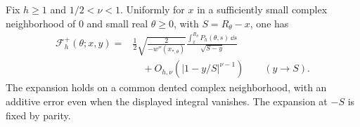 \begin{prp}\label{prp:s08:recovered-singularity}
Fix $h\geq1$ and $1/2<\nu<1$. Uniformly for $x$ in a sufficiently
small complex neighborhood of $0$ and small real $\theta\geq0$,
with $S=R_\theta-x$, one has
\begin{equation}\label{eq:s08:recovered-singularity}
 \begin{aligned}
 \mathcal F_h^+(\theta;x,y)
 ={}&\frac{1}{2}\sqrt{\frac{2}{-w''(x_{*,\theta})}}
       \frac{\displaystyle\int_x^{R_\theta}P_h(\theta,s)\,\dd s}
            {\sqrt{S-y}}\\
 &\quad+O_{h,\nu}(|1-y/S|^{\nu-1})
                         \qquad(y\longrightarrow S).
 \end{aligned}
\end{equation}
The expansion holds on a common dented complex neighborhood, with
an additive error even when the displayed integral vanishes.
The expansion at $-S$ is fixed by parity.
\end{prp}
